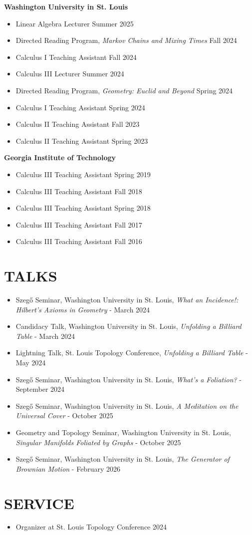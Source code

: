 \documentclass[a4paper,11pt]{extarticle}
\begin{document}
\textbf{Washington University in St. Louis}

\begin{itemize}
    \item Linear Algebra Lecturer \hfill Summer 2025
    \item Directed Reading Program, \emph{Markov Chains and Mixing Times} \hfill Fall 2024
    \item Calculus I Teaching Assistant \hfill Fall 2024
    \item Calculus III Lecturer \hfill Summer 2024
    \item Directed Reading Program, \emph{Geometry: Euclid and Beyond}
    \hfill Spring 2024
    \item Calculus I Teaching Assistant
    \hfill Spring 2024
    \item Calculus II Teaching Assistant \hfill Fall 2023
    \item Calculus II Teaching Assistant \hfill Spring 2023
\end{itemize}

\noindent
\textbf{Georgia Institute of Technology}

\begin{itemize}
    \item Calculus III Teaching Assistant \hfill Spring 2019
    \item Calculus III Teaching Assistant \hfill Fall 2018
    \item Calculus III Teaching Assistant \hfill Spring 2018
    \item Calculus III Teaching Assistant \hfill Fall 2017
    \item Calculus III Teaching Assistant \hfill Fall 2016
\end{itemize}

\section*{TALKS}
\begin{itemize}
    \item Szegő Seminar, Washington University in St. Louis, \emph{What an Incidence!: Hilbert's Axioms in Geometry} - March 2024
    \item Candidacy Talk, Washington University in St. Louis, \emph{Unfolding a Billiard Table} - March 2024
    \item Lightning Talk, St. Louis Topology Conference, \emph{Unfolding a Billiard Table} - May 2024
    \item Szegő Seminar, Washington University in St. Louis, \emph{What's a Foliation?} - September 2024
    \item Szegő Seminar, Washington University in St. Louis, \emph{A Meditation on the Universal Cover} - October 2025
    \item Geometry and Topology Seminar, Washington University in St. Louis, \emph{Singular Manifolds Foliated by Graphs} - October 2025
    \item Szegő Seminar, Washington University in St. Louis, \emph{The Generator of Brownian Motion} - February 2026
\end{itemize}

\section*{SERVICE}
\begin{itemize}
    \item Organizer at St. Louis Topology Conference 2024
\end{itemize}


\end{document}
